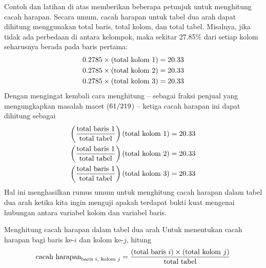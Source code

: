 Contoh dan latihan di atas memberikan beberapa petunjuk
untuk menghitung cacah harapan.
Secara umum, cacah harapan untuk tabel dua arah dapat
dihitung menggunakan total baris, total kolom,
dan total tabel.
Misalnya, jika tidak ada perbedaan di antara kelompok,
maka sekitar 27.85\% dari setiap kolom seharusnya berada pada baris pertama:
\begin{align*}
0.2785{}\times (\text{total kolom 1}) &= 20.33{} \\
0.2785{}\times (\text{total kolom 2}) &= 20.33{} \\
0.2785{}\times (\text{total kolom 3}) &= 20.33{}
\end{align*}
Dengan mengingat kembali cara menghitung \iPodAFraction{} --
sebagai fraksi penjual yang mengungkapkan masalah macet
($61{}/219{}$) --
ketiga cacah harapan ini dapat dihitung sebagai
\begin{align*}
\left(\frac{\text{total baris 1}}{\text{total tabel}}\right)
    \text{(total kolom 1)} &= 20.33{} \\
\left(\frac{\text{total baris 1}}{\text{total tabel}}\right)
    \text{(total kolom 2)} &= 20.33{} \\
\left(\frac{\text{total baris 1}}{\text{total tabel}}\right)
    \text{(total kolom 3)} &= 20.33{}
\end{align*}
Hal ini menghasilkan rumus umum untuk menghitung cacah
harapan dalam tabel dua arah ketika kita ingin menguji apakah
terdapat bukti kuat mengenai hubungan antara variabel
kolom dan variabel baris.

\D{\newpage}

\begin{onebox}{Menghitung cacah harapan dalam tabel dua arah}
  Untuk menentukan cacah harapan bagi baris ke-$i$
  dan kolom ke-$j$, hitung
  \begin{align*}
  \text{cacah harapan}_{\text{baris }i,\text{ kolom }j}
    = \frac{(\text{total baris $i$}) \times
        (\text{total kolom $j$})}{\text{total tabel}}\vspace{2mm}
  \end{align*}
\end{onebox}

%
